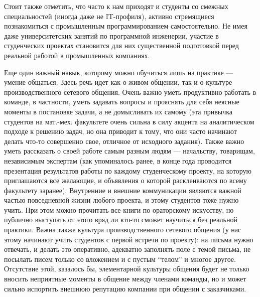 \documentclass[a4paper]{article}
\begin{document}
Стоит также отметить, что часто к нам приходят и студенты со смежных специальностей (иногда даже не IT-профиля), активно стремящиеся познакомиться с промышленным программированием самостоятельно. Не имея даже университетских занятий по программной инженерии, участие в студенческих проектах становится для них существенной подготовкой перед реальной работой в промышленных компаниях.

Еще один важный навык, которому можно обучиться лишь на практике --- умение общаться. Здесь речь идет как о живом общении, так и о культуре производственного сетевого общения.  Очень важно уметь продуктивно работать в команде, в частности, уметь задавать вопросы и прояснять для себя неясные моменты в постановке задачи, а не домысливать их самому (эта привычка студентов на мат.-мех. факультете очень сильна в силу акцента на аналитическом подходе к решению задач, но она приводит к тому, что они часто начинают делать что-то совершенно свое, отличное от исходного задания). Также важно уметь рассказать о своей работе самым разным людям --- начальству, товарищам, независимым экспертам (как упоминалось ранее, в конце года проводится презентация результатов работы по каждому студенческому проекту, на которую приглашаются все желающие, и объявления о которой расклеиваются по всему факультету заранее). Внутренние и внешние коммуникации являются важной частью повседневной жизни любого проекта, и этому студентов тоже нужно учить. При этом можно прочитать все книги по ораторскому искусству, но публично выступать от этого вряд ли кто-то сможет научиться без реальной практики. Важна также культура производственного сетевого общения (у нас этому начинают учить студентов с первой встречи по проекту): на письма нужно отвечать, и делать это оперативно, адекватно заполнять поле с темой письма, не посылать писем только со вложением и с пустым ``телом'' и многое другое. Отсутствие этой, казалось бы, элементарной культуры общения будет не только вносить неприятные моменты в общение между членами команды, но и может сильно испортить внешнюю репутацию компании при общении с заказчиками.
\end{document}
